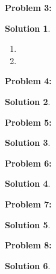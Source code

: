 \documentclass[12pt, letterpaper]{article}
\theoremstyle{nonumberplain}
\newtheorem{sol}{Solution}
\begin{document}
\hspace{18pt}\textbf{Problem 3:} \medskip
\begin{sol}
    \begin{enumerate}[label=\alph*)]
        \item
        \item
    \end{enumerate}
\end{sol}

\hspace{18pt}\textbf{Problem 4:} \medskip
\begin{sol}
    
\end{sol}

\hspace{18pt}\textbf{Problem 5:} \medskip
\begin{sol}
    
\end{sol}

\hspace{18pt}\textbf{Problem 6:} \medskip
\begin{sol}
    
\end{sol}

\hspace{18pt}\textbf{Problem 7:} \medskip
\begin{sol}
    
\end{sol}

\hspace{18pt}\textbf{Problem 8:} \medskip
\begin{sol}
    
\end{sol}
\end{document}
